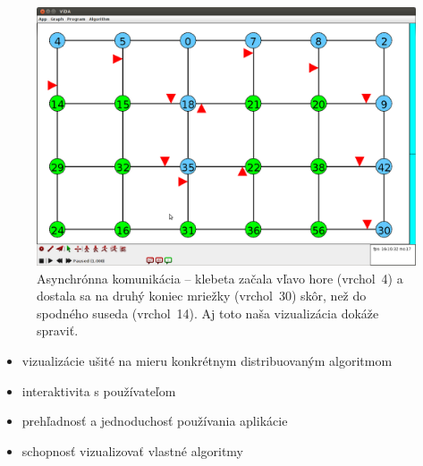\begin{figure}
\includegraphics[width=\columnwidth]{asyn}
\vspace{-1cm}
\caption{Asynchrónna komunikácia -- klebeta začala vľavo hore (vrchol~4) a dostala sa na druhý
koniec mriežky (vrchol~30) skôr, než do spodného suseda (vrchol~14). Aj toto naša vizualizácia
dokáže spraviť. }
\end{figure}

\begin{itemize}
    \item vizualizácie ušité na mieru konkrétnym distribuovaným algoritmom
    \item interaktivita s používateľom
    \item prehľadnosť a jednoduchosť používania aplikácie
    \item schopnosť vizualizovať vlastné algoritmy
\end{itemize}
\vspace{-0.5cm}
